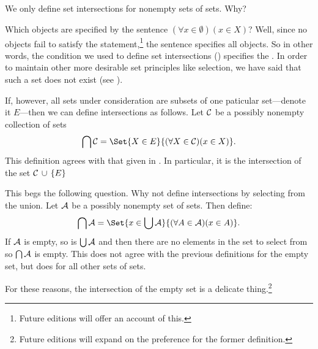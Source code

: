 

We only define set intersections for nonempty sets of sets.
Why?


Which objects are specified by the sentence $(\forall x \in \emptyset)(x \in X)$?
Well, since no objects fail to satisfy the statement,\footnote{Future editions will offer an account of this.} the sentence specifies all objects.
So in other words, the condition we used to define set intersections () specifies the .
In order to maintain other more desirable set principles like selection, we have said that such a set does not exist (see ).

If, however, all sets under consideration are subsets of one paticular set---denote it $E$---then we can define intersections as follows.
Let $\mathcal{C}$ be a possibly nonempty collection of sets
\[
  \bigcap \CC = \Set{X \in E}{(\forall X \in \CC)(x \in X)}.
\]
This definition agrees with that given in .
In particular, it is the intersection of the set $\mathcal{C} \,\cup\, \{E\}$



This begs the following question.
Why not define intersections by selecting from the union.
Let $\mathcal{A}$ be a possibly nonempty set of sets.
Then define:
\[
  \bigcap \CA = \Set{x \in \bigcup \CA}{(\forall A \in \CA)(x \in A)}.
\]
If $\mathcal{A}$ is empty, so is $\bigcup \mathcal{A}$ and then there are no elements in the set to select from so $\bigcap\mathcal{A}$ is empty.
This does not agree with the previous definitions for the empty set, but does for all other sets of sets.

For these reasons, the intersection of the empty set is a delicate thing.\footnote{Future editions will expand on the preference for the former definition.}
